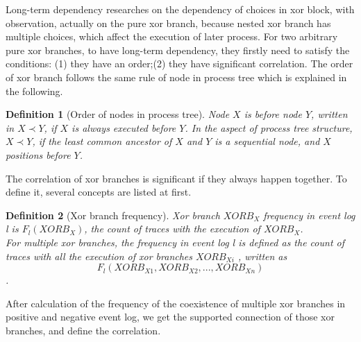 \documentclass[]{article}
\newtheorem{mydef}{Definition}[section]
\begin{document}

Long-term dependency researches on the dependency of choices in xor block, with observation, actually on the pure xor branch, because nested xor branch has multiple choices, which affect the execution of later process. For two arbitrary pure xor branches, to have long-term dependency, they firstly need to satisfy the conditions: (1) they have an order;(2) they have significant correlation.
The order of xor branch follows the same rule of node in process tree which is explained in the following.
\begin{mydef}[Order of nodes in process tree]
	Node $X$ is before node $Y$, written in $X \prec Y$, if $X$ is always executed before $Y$.  In the aspect of process tree structure, $X \prec Y$, if the least common ancestor of $X$ and $Y$ is a sequential node, and $X$ positions before $Y$.
\end{mydef} 
The correlation of xor branches is significant if they always happen together. To define it, several concepts are listed at first. 
\begin{mydef}[Xor branch frequency]
	Xor branch $XORB_X$ frequency in event log l is $F_{l}(XORB_X)$, the count of traces with the execution of $XORB_X$. \\
	For multiple xor branches, the frequency in event log l is defined as the count of traces with all the execution of xor branches $XORB_{Xi}$ , written as \[F_{l}(XORB_{X1}, XORB_{X2},...,XORB_{Xn})\].
\end{mydef}
After calculation of the frequency of the coexistence of multiple xor branches in positive and negative event log, we get the supported connection of those xor branches, and define the correlation. 
\end{document}

